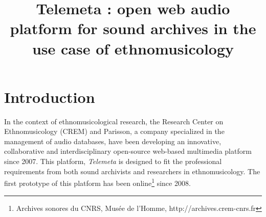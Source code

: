 \documentclass{paper}
\title{Telemeta : open web audio platform for sound archives in the use case of ethnomusicology}
\begin{document}
%
\maketitle
%



\section{Introduction}\label{sec:intro}


  In the context of ethnomusicological research, the Research Center on Ethnomusicology 
(CREM) and Parisson, a company specialized in the management of audio databases, have been developing an innovative, collaborative and interdisciplinary open-source web-based multimedia platform since 2007. This platform, \emph{Telemeta} is designed to fit the professional requirements from both sound archivists and researchers in ethnomusicology. The first prototype of this platform has been online\footnote{Archives sonores du CNRS, Musée de l'Homme, http://archives.crem-cnrs.fr} since 2008.
\end{document}
